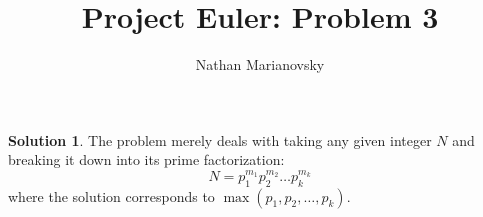 \documentclass[12pt, letterpaper, onecolumn, conference, final]{IEEEtran}
\title{Project Euler: Problem 3}
\author{Nathan Marianovsky}
\theoremstyle{definition}
\newtheorem*{problem*}{Problem}
\newtheorem*{solution*}{Solution}
\theoremstyle{plain}
\begin{document}
\maketitle

\begin{center}
\end{center}

\vspace{.3cm}
\begin{solution*}
The problem merely deals with taking any given integer $N$ and breaking it down into its prime factorization:
\begin{equation*}
N = p_1^{m_1} p_2^{m_2} \dots p_k^{m_k}
\end{equation*}
where the solution corresponds to $\max(p_1, p_2, \dots, p_k)$.
\end{solution*}
\end{document}
